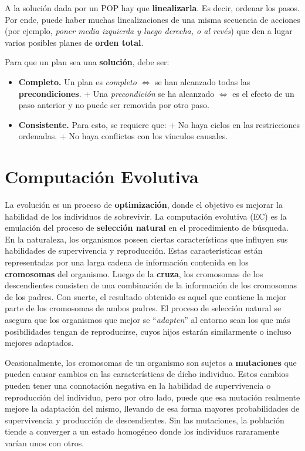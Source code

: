 \documentclass[10pt,a4paper]{article}
\begin{document}
A la solución dada por un POP hay que \textbf{linealizarla}. Es decir, ordenar los pasos. Por ende, puede haber muchas linealizaciones de una misma secuencia de acciones (por ejemplo, \textit{poner media izquierda y luego derecha, o al revés}) que den a lugar varios posibles planes de \textbf{orden total}.

Para que un plan sea una \textbf{solución}, debe ser:
\begin{itemize}
\item \textbf{Completo.} Un plan es \textit{completo} $\iff$ se han alcanzado todas las
\textbf{precondiciones}. 
\subitem + Una \textit{precondición} se ha alcanzado $\iff$ es el efecto de un paso anterior y no puede ser removida por otro paso.
\item \textbf{Consistente.} Para esto, se requiere que:
\subitem + No haya ciclos en las restricciones ordenadas.
\subitem + No haya conflictos con los vínculos causales.
\end{itemize}



\section{Computación Evolutiva}

La evolución es un proceso de \textbf{optimización}, donde el objetivo es mejorar la habilidad de los individuos de sobrevivir. La computación evolutiva (EC) es la emulación del proceso de \textbf{selección natural} en el procedimiento de búsqueda. En la naturaleza, los organismos poseen ciertas características que influyen sus habilidades de supervivencia y reproducción. Estas características están representadas por una larga cadena de información contenida en los \textbf{cromosomas} del organismo. Luego de la \textbf{cruza}, los cromosomas de los descendientes consisten de una combinación de la información de los cromosomas de los padres. Con suerte, el resultado obtenido es aquel que contiene la mejor parte de los cromosomas de ambos padres. El proceso de selección natural se asegura que los organismos que mejor se ``\textit{adapten}'' al entorno sean los que más posibilidades tengan de reproducirse, cuyos hijos estarán similarmente o incluso mejores adaptados.

Ocasionalmente, los cromosomas de un organismo son sujetos a \textbf{mutaciones} que pueden causar cambios en las características de dicho individuo. Estos cambios pueden tener una connotación negativa en la habilidad de supervivencia o reproducción del individuo, pero por otro lado, puede que esa mutación realmente mejore la adaptación del mismo, llevando de esa forma mayores probabilidades de supervivencia y producción de descendientes. Sin las mutaciones, la población tiende a converger a un estado homogéneo donde los individuos rararamente varían unos con otros.
\end{document}
